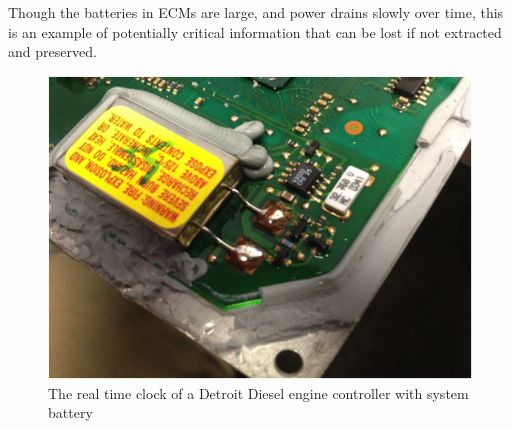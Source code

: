 Though the batteries in ECMs are large, and power drains slowly over time, this is an example of potentially critical information that can be lost if not extracted and preserved.

\begin{figure}[h]
  \centering
  \includegraphics{clockbatt}
  \caption{The real time clock of a Detroit Diesel engine controller with system battery}
  \label{fig:clockbatt}

\end{figure}
